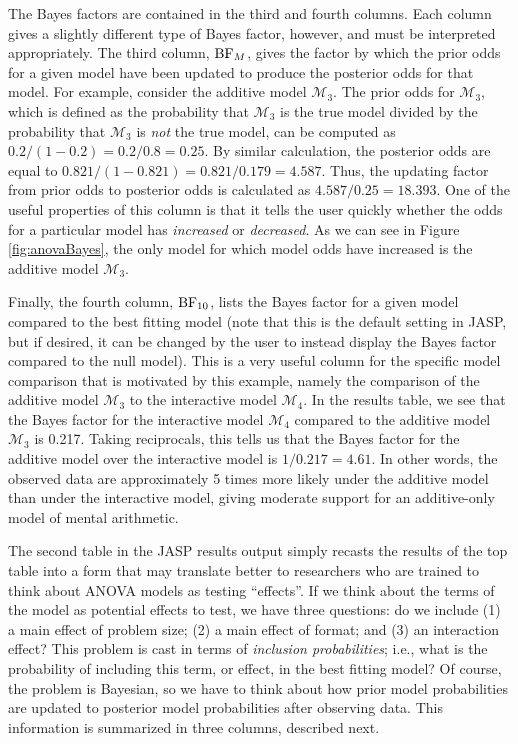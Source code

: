 \documentclass[english,,doc,floatsintext]{apa6}
\begin{document}
The Bayes factors are contained in the third and fourth columns. Each column gives a slightly different type of Bayes factor, however, and must be interpreted appropriately. The third column, \(\textnormal{BF}_{M}\), gives the factor by which the prior odds for a given model have been updated to produce the posterior odds for that model. For example, consider the additive model \(\mathcal{M}_3\). The prior odds for \(\mathcal{M}_3\), which is defined as the probability that \(\mathcal{M}_3\) is the true model divided by the probability that \(\mathcal{M}_3\) is \emph{not} the true model, can be computed as \(0.2/(1-0.2) = 0.2/0.8 = 0.25\). By similar calculation, the posterior odds are equal to \(0.821/(1-0.821) = 0.821/0.179 = 4.587\). Thus, the updating factor from prior odds to posterior odds is calculated as \(4.587/0.25 = 18.393\). One of the useful properties of this column is that it tells the user quickly whether the odds for a particular model has \emph{increased} or \emph{decreased}. As we can see in Figure \ref{fig:anovaBayes}, the only model for which model odds have increased is the additive model \(\mathcal{M}_3\).

Finally, the fourth column, \(\textnormal{BF}_{10}\), lists the Bayes factor for a given model compared to the best fitting model (note that this is the default setting in JASP, but if desired, it can be changed by the user to instead display the Bayes factor compared to the null model). This is a very useful column for the specific model comparison that is motivated by this example, namely the comparison of the additive model \(\mathcal{M}_3\) to the interactive model \(\mathcal{M}_4\). In the results table, we see that the Bayes factor for the interactive model \(\mathcal{M}_4\) compared to the additive model \(\mathcal{M}_3\) is 0.217. Taking reciprocals, this tells us that the Bayes factor for the additive model over the interactive model is \(1/0.217 = 4.61\). In other words, the observed data are approximately 5 times more likely under the additive model than under the interactive model, giving moderate support for an additive-only model of mental arithmetic.

The second table in the JASP results output simply recasts the results of the top table into a form that may translate better to researchers who are trained to think about ANOVA models as testing \enquote{effects}. If we think about the terms of the model as potential effects to test, we have three questions: do we include (1) a main effect of problem size; (2) a main effect of format; and (3) an interaction effect? This problem is cast in terms of \emph{inclusion probabilities}; i.e., what is the probability of including this term, or effect, in the best fitting model? Of course, the problem is Bayesian, so we have to think about how prior model probabilities are updated to posterior model probabilities after observing data. This information is summarized in three columns, described next.
\end{document}
